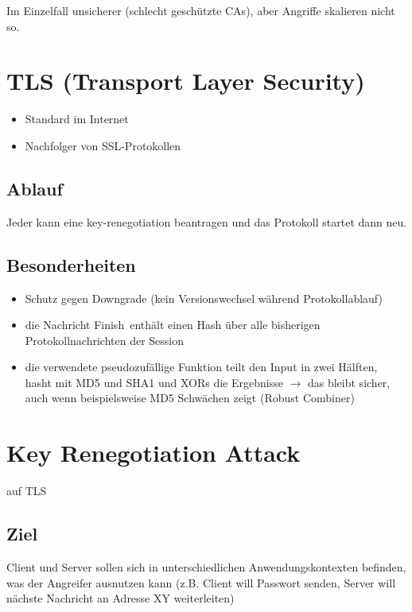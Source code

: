 \documentclass[a4paper,twoside,DIV15,BCOR12mm]{scrbook}
\begin{document}
Im Einzelfall unsicherer (schlecht geschützte CAs), aber Angriffe skalieren nicht so.

\section{TLS (Transport Layer Security)}

\begin{itemize}
	\item Standard im Internet
	\item Nachfolger von SSL-Protokollen
\end{itemize}

\subsection{Ablauf}


Jeder kann eine key-renegotiation beantragen und das Protokoll startet dann neu.

\subsection{Besonderheiten}

\begin{itemize}
	\item Schutz gegen Downgrade (kein Versionswechsel während Protokollablauf)
	\item die Nachricht \glqq Finish\grqq\ enthält einen Hash über alle bisherigen Protokollnachrichten der Session
	\item die verwendete pseudozufällige Funktion teilt den Input in zwei Hälften, hasht mit MD5 und SHA1 und XORs die Ergebnisse $\rightarrow$ das bleibt sicher, auch wenn beispielsweise MD5 Schwächen zeigt (\glqq Robust Combiner\grqq)
\end{itemize}
		
\section{Key Renegotiation Attack}

auf TLS

\subsection{Ziel} 

Client und Server sollen sich in unterschiedlichen Anwendungskontexten befinden, was der Angreifer ausnutzen kann (z.B. Client will Passwort senden, Server will nächste Nachricht an Adresse XY weiterleiten)
\end{document}
